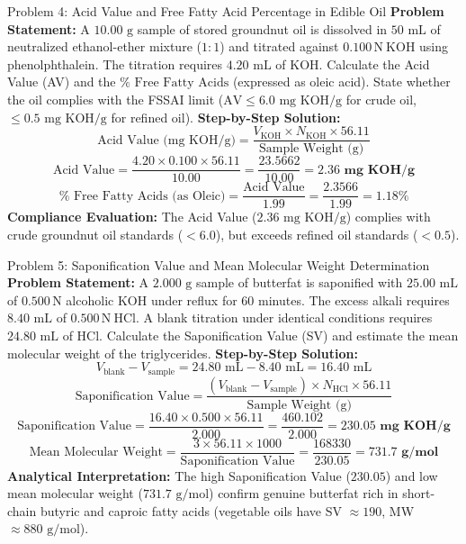 \documentclass[11pt,a4paper,oneside]{article}
\begin{document}
\begin{examplebox}{Problem 4: Acid Value and Free Fatty Acid Percentage in Edible Oil}
\textbf{Problem Statement:}
A $10.00\text{ g}$ sample of stored groundnut oil is dissolved in $50\text{ mL}$ of neutralized ethanol-ether mixture ($1:1$) and titrated against $0.100\,\mathrm{N}\ \mathrm{KOH}$ using phenolphthalein. The titration requires $4.20\text{ mL}$ of $\mathrm{KOH}$.
Calculate the Acid Value (AV) and the $\% \text{ Free Fatty Acids}$ (expressed as oleic acid). State whether the oil complies with the FSSAI limit ($\text{AV} \le 6.0\text{ mg KOH/g}$ for crude oil, $\le 0.5\text{ mg KOH/g}$ for refined oil).
\vspace{0.2cm}
\textbf{Step-by-Step Solution:}
$$\text{Acid Value (mg KOH/g)} = \frac{V_{\mathrm{KOH}} \times N_{\mathrm{KOH}} \times 56.11}{\text{Sample Weight (g)}}$$
$$\text{Acid Value} = \frac{4.20 \times 0.100 \times 56.11}{10.00} = \frac{23.5662}{10.00} = \mathbf{2.36\text{ mg KOH/g}}$$
$$\% \text{ Free Fatty Acids (as Oleic)} = \frac{\text{Acid Value}}{1.99} = \frac{2.3566}{1.99} = \mathbf{1.18\%}$$
\textbf{Compliance Evaluation:} The Acid Value ($2.36\text{ mg KOH/g}$) complies with crude groundnut oil standards ($<6.0$), but exceeds refined oil standards ($<0.5$).
\end{examplebox}

\begin{examplebox}{Problem 5: Saponification Value and Mean Molecular Weight Determination}
\textbf{Problem Statement:}
A $2.000\text{ g}$ sample of butterfat is saponified with $25.00\text{ mL}$ of $0.500\,\mathrm{N}$ alcoholic $\mathrm{KOH}$ under reflux for 60 minutes. The excess alkali requires $8.40\text{ mL}$ of $0.500\,\mathrm{N}\ \mathrm{HCl}$. A blank titration under identical conditions requires $24.80\text{ mL}$ of $\mathrm{HCl}$.
Calculate the Saponification Value (SV) and estimate the mean molecular weight of the triglycerides.
\vspace{0.2cm}
\textbf{Step-by-Step Solution:}
$$V_{\text{blank}} - V_{\text{sample}} = 24.80\text{ mL} - 8.40\text{ mL} = 16.40\text{ mL}$$
$$\text{Saponification Value} = \frac{(V_{\text{blank}} - V_{\text{sample}}) \times N_{\mathrm{HCl}} \times 56.11}{\text{Sample Weight (g)}}$$
$$\text{Saponification Value} = \frac{16.40 \times 0.500 \times 56.11}{2.000} = \frac{460.102}{2.000} = \mathbf{230.05\text{ mg KOH/g}}$$
$$\text{Mean Molecular Weight} = \frac{3 \times 56.11 \times 1000}{\text{Saponification Value}} = \frac{168330}{230.05} = \mathbf{731.7\text{ g/mol}}$$
\textbf{Analytical Interpretation:} The high Saponification Value ($230.05$) and low mean molecular weight ($731.7\text{ g/mol}$) confirm genuine butterfat rich in short-chain butyric and caproic fatty acids (vegetable oils have SV $\approx 190$, MW $\approx 880\text{ g/mol}$).
\end{examplebox}
\end{document}
